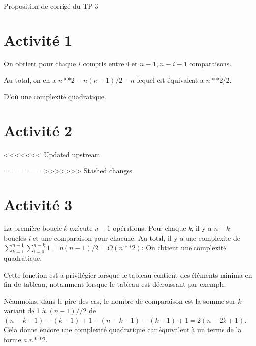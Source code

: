
	
\begin{Large}
	Proposition de corrigé du TP 3
\end{Large}


\section*{Activité 1}



\eject 



On obtient pour chaque $i$ compris entre 0 et $n-1$, $n-i-1$ comparaisons.

Au total, on en a $n**2-n(n-1)/2-n$ lequel est équivalent a $n**2/2$.

D'où une complexité quadratique.


\eject

\section*{Activité 2}

<<<<<<< Updated upstream

\vspace{3.5cm}
=======
\vspace{3.5cm}
>>>>>>> Stashed changes

\eject \section*{Activité 3}



La première boucle $k$ ex\'ecute $n-1$ opérations. Pour chaque $k$, il y a $n-k$ boucles $i$ et une comparaison pour chacune. Au total, il y a une complexite de $\displaystyle\sum_{k=1}^{n-1}\sum_{i=0}^{n-k} 1 =n(n-1)/2 = O(n**2)$:
On obtient une complexité quadratique.



Cette fonction est a privilégier lorsque le tableau contient des éléments minima en fin de tableau, notamment lorsque le tableau est décroissant par exemple.

Néanmoins, dans le pire des cas, le nombre de comparaison est la somme sur $k$ variant de 1 à $(n-1)//2$ de $(n-k-1)-(k-1)+1+(n-k-1)-(k-1)+1=2(n-2k+1)$. Cela donne encore une complexité quadratique car équivalent à un terme de la forme $a.n**2$.



